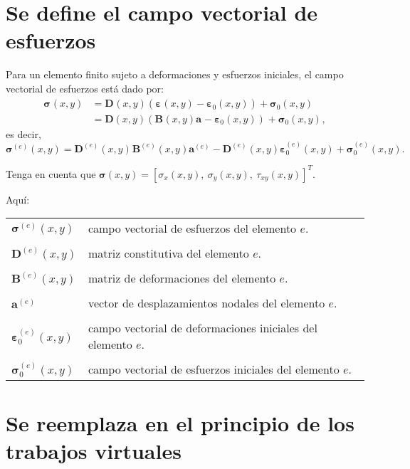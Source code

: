 \documentclass[12pt,letterpaper, landscape]{article}
\newcommand{\e}{{}}
\newcommand{\ve}[1]{{\boldsymbol{#1}}}
\newcommand{\ma}[1]{{\boldsymbol{#1}}}
\begin{document}
\newpage

\section{Se define el campo vectorial de esfuerzos}

Para un elemento finito sujeto a deformaciones y esfuerzos iniciales, el campo vectorial de esfuerzos está dado por:
\begin{align}
\ve{\sigma}^\e(x,y) &= \ma{D}^\e(x,y)\left(\ve{\varepsilon}^\e(x,y) - \ve{\varepsilon}_0^\e(x,y)\right) + \ve{\sigma}_0^\e(x,y) \\
&= \ma{D}(x,y)\left(\ma{B}^\e(x,y)\ve{a}^\e - \ve{\varepsilon}_0(x,y)\right)^\e + \ve{\sigma}_0(x,y)^\e,
\end{align}
es decir,
\begin{equation}
\ve{\sigma}^{(e)}(x,y) =  \ma{D}^{(e)}(x,y)^\e\ma{B}^{(e)}(x,y)\ve{a}^{(e)} - \ma{D}^{(e)}(x,y)\ve{\varepsilon}_0^{(e)}(x,y) + \ve{\sigma}_0^{(e)}(x,y). \label{eq:constitutiva}
\end{equation}

Tenga en cuenta que $\ve{\sigma}(x,y) = [\sigma_x(x,y),\ \sigma_y(x,y),\ \tau_{xy}(x,y)]^T$.

Aquí:

\begin{tabular}{ll}
   $\ve{\sigma}^{(e)}(x,y)$     & campo vectorial de esfuerzos del elemento $e$.\\
\\[-1ex]   
   $\ma{D}^{(e)}(x,y)$ & matriz constitutiva del elemento $e$. \\
\\[-1ex]
   $\ma{B}^{(e)}(x,y)$  & {matriz de deformaciones del elemento} $e$.\\
   \\[-1ex]
   $\ve{a}^{(e)}$       & {vector de desplazamientos nodales del elemento} $e$. \\
   \\[-1ex]
   $\ve{\varepsilon}_0^{(e)}(x,y)$ & campo vectorial de deformaciones iniciales del elemento $e$. \\
   \\[-1ex]
   $\ve{\sigma}_0^{(e)}(x,y)$ & campo vectorial de esfuerzos iniciales del elemento $e$.   
\end{tabular} 

\newpage

\section{Se reemplaza en el principio de los trabajos virtuales}
\end{document}
